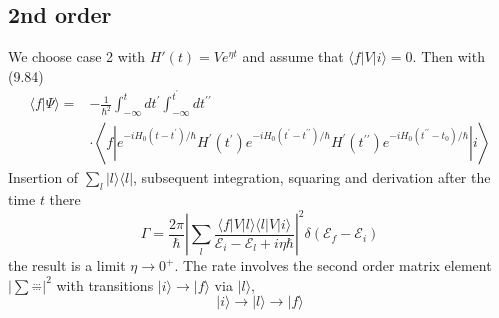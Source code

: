 \subsection{2nd order}
We choose case 2 with $H'(t) = V e^{\eta t}$ and assume that $\langle f | V | i\rangle = 0$. Then with ({\color{red}9.84})
\begin{equation}
\begin{aligned}\langle f | \Psi\rangle=&-\frac{1}{\hbar^{2}} \int_{-\infty}^{t} d t^{\prime} \int_{-\infty}^{t^{\prime}} d t^{\prime \prime} \\ & \cdot\left\langle f\left|e^{-i H_{0}\left(t-t^{\prime}\right) / \hbar} H^{\prime}\left(t^{\prime}\right) e^{-i H_{0}\left(t^{\prime}-t^{\prime \prime}\right) / \hbar} H^{\prime}\left(t^{\prime \prime}\right) e^{-i H_{0}\left(t^{\prime \prime}-t_{0}\right) / \hbar}\right| i\right\rangle \end{aligned}
\end{equation}
Insertion of $\sum_l|l\rangle\langle l|$, subsequent integration, squaring and derivation after the time $t$ there
\begin{equation}
    \Gamma=\frac{2 \pi}{\hbar}\left|\sum_{l} \frac{\langle f|V| l\rangle\langle l|V| i\rangle}{\mathcal{E}_{i}-\mathcal{E}_{l}+i \eta \hbar}\right|^{2} \delta\left(\mathcal{E}_{f}-\mathcal{E}_{i}\right)
    \end{equation}
the result is a limit $\eta\rightarrow 0^+$. The rate involves the second order matrix element $|\sum\mathop{-}\limits_{\cdots}^{...}|^2$  with transitions $| i\rangle\rightarrow | f\rangle$ via $| l\rangle$,
\begin{equation}
    |i\rangle \longrightarrow|l\rangle \longrightarrow|f\rangle
    \end{equation}
